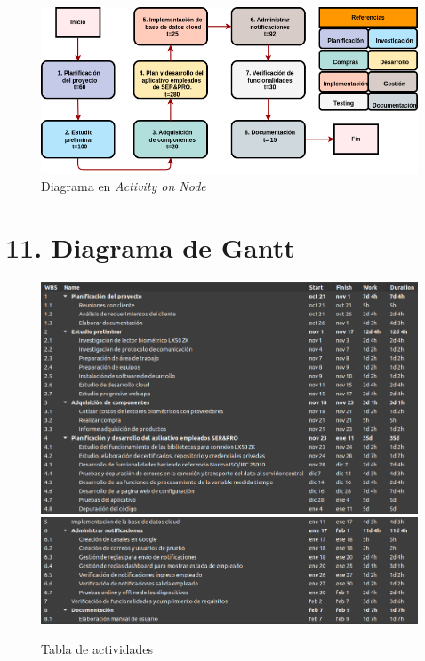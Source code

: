 \documentclass[
11pt, %
]{charter}
\begin{document}
\begin{figure}[htpb]
\centering 
\includegraphics[width=.8\textwidth]{./Figuras/AoN.png}
\caption{Diagrama en \textit{Activity on Node}}
\label{fig:AoN}
\end{figure}




\section{11. Diagrama de Gantt}
\label{sec:gantt}


\begin{figure}[htpb]
\centering 
\includegraphics[width=1\textwidth]{./Figuras/GantTasks1.png}
\includegraphics[width=1\textwidth]{./Figuras/GantTasks2.png}
\caption{Tabla de actividades}
\label{fig:AoN}
\end{figure}
\end{document}

